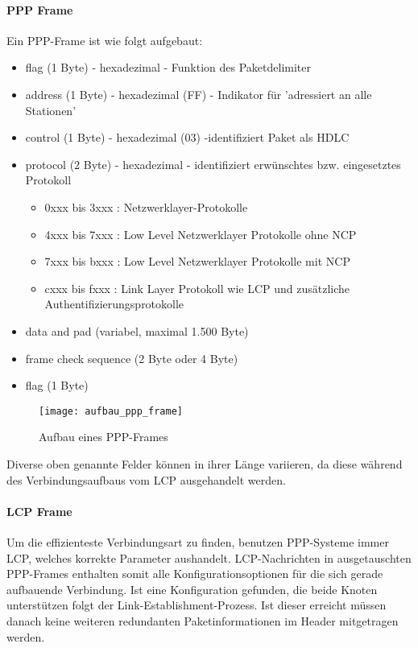 \paragraph{PPP Frame}
Ein \ac{PPP}-Frame ist wie folgt aufgebaut:

\begin{itemize}
\item flag (1 Byte) - hexadezimal - Funktion des Paketdelimiter
\item address (1 Byte) - hexadezimal (FF) - Indikator für 'adressiert an alle Stationen'
\item control (1 Byte) - hexadezimal (03) -identifiziert Paket als \ac{HDLC}
\item protocol (2 Byte) - hexadezimal - identifiziert erwünschtes bzw. eingesetztes Protokoll
	\begin{itemize}
		\item 0xxx bis 3xxx : Netzwerklayer-Protokolle
		\item 4xxx bis 7xxx : Low Level Netzwerklayer Protokolle ohne \ac{NCP}
		\item 7xxx bis bxxx : Low Level Netzwerklayer Protokolle mit \ac{NCP}
		\item cxxx bis fxxx : Link Layer Protokoll wie LCP und zusätzliche Authentifizierungsprotokolle
	\end{itemize}
\item data and pad (variabel, maximal 1.500 Byte)
\item frame check sequence (2 Byte oder 4 Byte)
\item flag (1 Byte)
\end{itemize}

 \begin{figure}[htp]
  \begin{center}
   \texttt{[image: aufbau\_ppp\_frame]}
  \end{center}
  \caption[Aufbau eines PPP-Frames]{Aufbau eines PPP-Frames \cite{tcpipillustrated}}
  \label{abb:aufbau_ppp_frame}
 \end{figure}

Diverse oben genannte Felder können in ihrer Länge variieren, da 
diese während des Verbindungsaufbaus vom \ac{LCP} ausgehandelt werden.

\paragraph{LCP Frame} Um die effizienteste Verbindungsart zu finden, benutzen PPP-Systeme
immer \ac{LCP}, welches korrekte Parameter aushandelt. LCP-Nachrichten in ausgetauschten
PPP-Frames enthalten somit alle Konfigurationsoptionen für die sich gerade aufbauende
Verbindung. Ist eine Konfiguration gefunden, die beide Knoten unterstützen folgt der
Link-Establishment-Prozess. Ist dieser erreicht müssen danach keine weiteren redundanten
Paketinformationen im Header mitgetragen werden.

